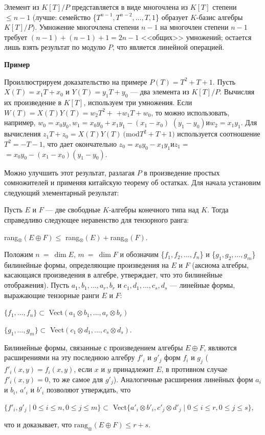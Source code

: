 \documentclass{mai_book}
\begin{document}
\begin{myproof}
  Элемент из $K[T]/P$ представляется в виде многочлена из $K[T]$ степени $\leqslant n-1$ (лучше: семейство \{$T^{n-1},T^{n-2},\ldots,T,1$\} образует $K$-базис алгебры $K[T]/P$). Умножение многочлена степени $n-1$ на многочлен степени $n-1$ требует $(n-1)+(n-1)+1=2n-1$ <<общих>> умножений; остается лишь взять результат по модулю $P$, что является линейной операцией.
  \end{myproof}
\begin{beznomera}
  \textbf{Пример}
  \end{beznomera}
Проиллюстрируем доказательство на примере $P(T)=T^2+T+1.$ Пусть $X(T)=x_1T+x_0$ и $Y(T)=y_1T+y_0$ --- два элемента из $K[T]/P$. Вычисляя их произведение в $K[T]$, используем три умножения. Если $W(T)=X(T)Y(T)=w_2T^2+$ $+w_1T+w_0$, то можно использовать, например, $w_0=x_0y_0, w_1=x_0y_0+x_1y_1-(x_1-x_0)$ $(y_1-y_0) и w_2=x_1y_1.$ Для вычисления $z_1T+z_0=X(T)Y(T)\ ($mod$T^2+T+1)$ используется соотношение $T^2=-T-1$, что дает окончательно $z_0=x_0y_0-x_1y_1 и z_1=$ $=x_0y_0-(x_1-x_0)(y_1-y_0).$\par
Можно улучшить этот результат, разлагая $P$ в произведение простых сомножителей и применяя китайскую теорему об остатках. Для начала установим следующий элементарный результат:
\begin{predl}
  Пусть $E$ и $F$ --- две свободные $K$-алгебры конечного типа над $K$. Тогда справедливо следующее неравенство для тензорного ранга:
  \begin{center}
    \textup{rang}$_{\otimes}(E \oplus F) \leqslant $ \textup{rang}$_{\otimes}(E)+ $\textup{rang}$_{\otimes}(F).$
    \end{center}
\end{predl}
\begin{myproof}
  Положим $n\ =\ \dim E$, $m\ =\ \dim F$ и обозначим \{$f_1,f_2,\ldots,f_n$\} и \{$g_1,g_2,\ldots,g_m$\} билинейные формы, определяющие произведения на $E$ и $F$ (аксиома алгебры, касающаяся произведения в алгебре, утверждает, что это билинейные отображения). Пусть $a_1,b_1,\ldots,a_r,b_r$ и $c_1,d_1,\ldots,c_s,d_s$ --- линейные формы, выражающие тензорные ранги $E$ и $F$:
  \begin{center}
$\{f_1,\ldots,f_n\} \subset$ Vect$(a_1 \otimes b_1,\ldots,a_r \otimes b_r)$\par
    $\{g_1,\ldots,g_m\} \subset$ Vect$(c_1 \otimes d_1,\ldots,c_s \otimes d_s).$
\end{center}
    \noindent
    Билинейные формы, связанные с произведением алгебры $E \oplus F$, являются расширениями на эту последнюю алгебру $f'_i$ и $g'_j$ форм $f_i$ и $g_j$ ($f'_i(x,y) = f_i(x,y)$, если $x$ и $y$ принадлежит $E$, в противном случае $f'_i(x,y) = 0$, то же самое для $g'_j$). Аналогичные расширения линейных форм $a_i$ и $b_i$, $a'_i$ и $b'_i$ позволяют утверждать, что
    \begin{center}
      $\{f'_i,g'_j \mid 0 \leqslant i \leqslant n, 0 \leqslant j \leqslant m\} \subset $ Vect$\{a'_i \otimes b'_i, c'_j \otimes d'_j \mid 0 \leqslant i \leqslant r, 0 \leqslant j \leqslant s\},$
   \end{center}
        \noindent
что и доказывает, что $\text{rang}_{\otimes}(E \oplus F) \leqslant r + s$.
\end{myproof}
\end{document}
